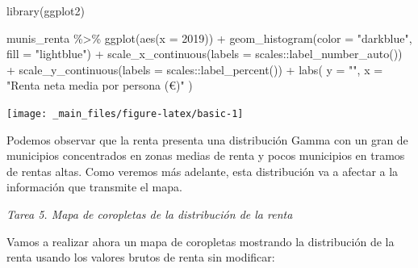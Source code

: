 \documentclass[
]{book}
\newenvironment{Shaded}{\begin{snugshade}}{\end{snugshade}}
\newcommand{\AttributeTok}[1]{\textcolor[rgb]{0.77,0.63,0.00}{#1}}
\newcommand{\FunctionTok}[1]{\textcolor[rgb]{0.00,0.00,0.00}{#1}}
\newcommand{\NormalTok}[1]{#1}
\newcommand{\SpecialCharTok}[1]{\textcolor[rgb]{0.00,0.00,0.00}{#1}}
\newcommand{\StringTok}[1]{\textcolor[rgb]{0.31,0.60,0.02}{#1}}
\begin{document}
\begin{Shaded}
\begin{Highlighting}[]

\FunctionTok{library}\NormalTok{(ggplot2)}

\NormalTok{munis\_renta }\SpecialCharTok{\%\textgreater{}\%}
  \FunctionTok{ggplot}\NormalTok{(}\FunctionTok{aes}\NormalTok{(}\AttributeTok{x =} \StringTok{\textasciigrave{}}\AttributeTok{2019}\StringTok{\textasciigrave{}}\NormalTok{)) }\SpecialCharTok{+}
  \FunctionTok{geom\_histogram}\NormalTok{(}\AttributeTok{color =} \StringTok{"darkblue"}\NormalTok{, }\AttributeTok{fill =} \StringTok{"lightblue"}\NormalTok{) }\SpecialCharTok{+}
  \FunctionTok{scale\_x\_continuous}\NormalTok{(}\AttributeTok{labels =}\NormalTok{ scales}\SpecialCharTok{::}\FunctionTok{label\_number\_auto}\NormalTok{()) }\SpecialCharTok{+}
  \FunctionTok{scale\_y\_continuous}\NormalTok{(}\AttributeTok{labels =}\NormalTok{ scales}\SpecialCharTok{::}\FunctionTok{label\_percent}\NormalTok{()) }\SpecialCharTok{+}
  \FunctionTok{labs}\NormalTok{(}
    \AttributeTok{y =} \StringTok{""}\NormalTok{,}
    \AttributeTok{x =} \StringTok{"Renta neta media por persona (€)"}
\NormalTok{  )}
\end{Highlighting}
\end{Shaded}

\begin{center}\texttt{[image: \_main\_files/figure-latex/basic-1]} \end{center}

Podemos observar que la renta presenta una distribución Gamma con un gran de
municipios concentrados en zonas medias de renta y pocos municipios en tramos de
rentas altas. Como veremos más adelante, esta distribución va a afectar a la
información que transmite el mapa.

\emph{Tarea 5. Mapa de coropletas de la distribución de la renta}

Vamos a realizar ahora un mapa de coropletas mostrando la distribución de la
renta usando los valores brutos de renta sin modificar:
\end{document}

